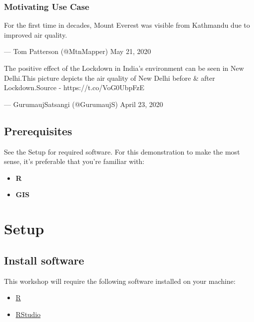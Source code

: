 \documentclass[]{book}
\providecommand{\tightlist}{%
  \setlength{\itemsep}{0pt}\setlength{\parskip}{0pt}}
\begin{document}
\hypertarget{motivating-use-case}{%
\subsection*{Motivating Use Case}\label{motivating-use-case}}

For the first time in decades, Mount Everest was visible from Kathmandu due to improved air quality.

--- Tom Patterson (@MtnMapper) May 21, 2020

The positive effect of the Lockdown in India's environment can be seen in New Delhi.This picture depicts the air quality of New Delhi before \& after Lockdown.Source - https://t.co/VoG0UbpFzE

--- GurumaujSatsangi (@GurumaujS) April 23, 2020

\hypertarget{prerequisites}{%
\section*{Prerequisites}\label{prerequisites}}

See the Setup for required software. For this demonstration to make the most sense, it's preferable that you're familiar with:

\begin{itemize}
\tightlist
\item
  \textbf{R}
\item
  \textbf{GIS}
\end{itemize}

\hypertarget{setup}{%
\chapter*{Setup}\label{setup}}

\hypertarget{install-software}{%
\section{Install software}\label{install-software}}

This workshop will require the following software installed on your machine:

\begin{itemize}
\tightlist
\item
  \href{http://cran.cnr.berkeley.edu/}{R}
\item
  \href{https://www.rstudio.com/products/rstudio/download/\#download}{RStudio}
\end{itemize}
\end{document}
